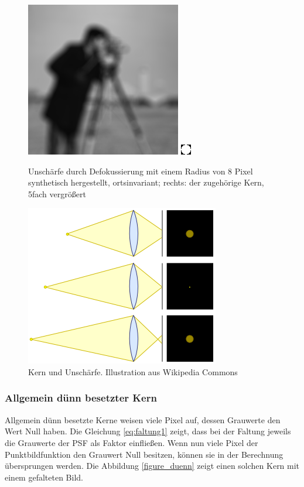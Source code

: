 \documentclass[a4paper,12pt]{article}
\begin{document}
\begin{figure}[htbp]
\centering
\includegraphics[scale=0.8]{lensblur17.png}
\includegraphics[scale=5]{kern_lensblur17.png}
\caption{Unschärfe durch Defokussierung mit einem Radius von 8 Pixel
synthetisch hergestellt, ortsinvariant; rechts: der zugehörige Kern, 5fach
vergrößert}%
\label{figure_lensblur}
\end{figure}

\begin{figure}[htbp]
\centering
\includegraphics[scale=0.5]{Cirles_of_confusion_lens_diagram.png}%
\caption{Kern und Unschärfe. Illustration aus Wikipedia Commons
\cite{circleofconfusion}}%
\label{figure_confusion}
\end{figure}

\subsubsection{Allgemein dünn besetzter Kern}
Allgemein dünn besetzte Kerne weisen viele Pixel auf, dessen Grauwerte den Wert
Null haben. Die Gleichung \ref{eq:faltung1} zeigt, dass bei der Faltung jeweils
die Grauwerte der PSF als Faktor einfließen. Wenn nun viele Pixel der
Punktbildfunktion den Grauwert Null besitzen, können sie in der Berechnung
übersprungen werden. Die Abbildung \ref{figure_duenn} zeigt einen solchen Kern mit einem gefalteten Bild.
\end{document}
